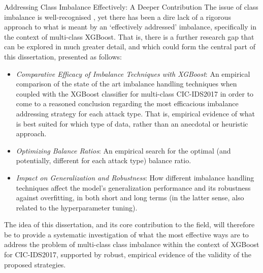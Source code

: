 Addressing Class Imbalance Effectively: A Deeper Contribution 
The issue of class imbalance is well-recognised \parencite{mahfouz2022systematic, aldhubaib2024network}, yet there has been a dire lack of a rigorous approach to what is meant by an `effectively addressed' imbalance, specifically in the context of multi-class XGBoost. That is, there is a further research gap that can be explored in much greater detail, and which could form the central part of this dissertation, presented as follows:
\begin{itemize}[noitemsep] 
\item \textit{Comparative Efficacy of Imbalance Techniques with XGBoost}: An empirical comparison of the state of the art imbalance handling techniques when coupled with the XGBoost classifier for multi-class CIC-IDS2017 in order to come to a reasoned conclusion regarding the most efficacious imbalance addressing strategy for each attack type. That is, empirical evidence of what is best suited for which type of data, rather than an anecdotal or heuristic approach.
\item \textit{Optimizing Balance Ratios}: An empirical search for the optimal (and potentially, different for each attack type) balance ratio.
\item \textit{Impact on Generalization and Robustness}: How different imbalance handling techniques affect the model's generalization performance and its robustness against overfitting, in both short and long terms (in the latter sense, also related to the hyperparameter tuning).
\end{itemize} 
The idea of this dissertation, and its core contribution to the field, will therefore be to provide a systematic investigation of what the most effective ways are to address the problem of multi-class class imbalance within the context of XGBoost for CIC-IDS2017, supported by robust, empirical evidence of the validity of the proposed strategies.

